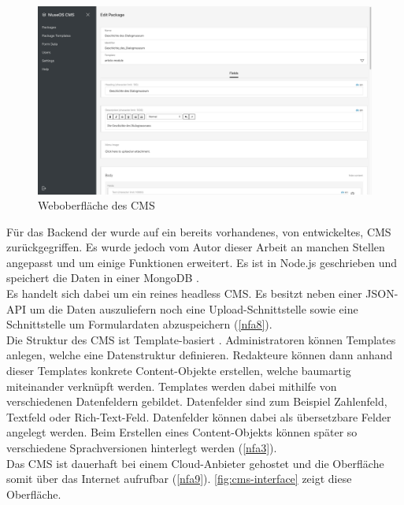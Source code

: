 \begin{figure}
    \centering
    \includegraphics[width=1\textwidth]{figures/images/cms-interface.png}
    \caption{Weboberfläche des CMS}
    \label{fig:cms-interface}
\end{figure}

Für das Backend der \shst{} wurde auf ein bereits vorhandenes, von \meso{} entwickeltes,
CMS zurückgegriffen. Es wurde jedoch vom Autor dieser Arbeit
an manchen Stellen angepasst und um einige Funktionen
erweitert. Es ist in Node.js \cite{node} geschrieben und speichert die Daten in einer 
MongoDB \cite{mongo}.\\
Es handelt sich dabei um ein reines headless CMS. Es besitzt neben einer JSON-API um die Daten 
auszuliefern noch eine Upload-Schnittstelle sowie eine Schnittstelle um Formulardaten abzuspeichern
(\ref{nfa8}).\\
Die Struktur des CMS ist Template-basiert . Administratoren können Templates 
anlegen, welche eine Datenstruktur definieren. Redakteure können dann anhand dieser Templates 
konkrete Content-Objekte erstellen, welche baumartig miteinander verknüpft werden. Templates 
werden dabei mithilfe von verschiedenen Datenfeldern gebildet. Datenfelder sind zum Beispiel
Zahlenfeld, Textfeld oder Rich-Text-Feld. Datenfelder können dabei als übersetzbare Felder angelegt
werden. Beim Erstellen eines Content-Objekts können später so verschiedene Sprachversionen
hinterlegt werden (\ref{nfa3}).\\
Das CMS ist dauerhaft bei einem Cloud-Anbieter gehostet und die Oberfläche somit über das
Internet aufrufbar (\ref{nfa9}). \autoref{fig:cms-interface} zeigt diese Oberfläche.

